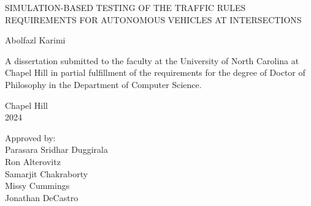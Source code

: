 \begin{titlepage}
\begin{center}


\vspace{2in}
\begin{singlespace}
    \MakeUppercase{Simulation-based Testing of the Traffic Rules Requirements for Autonomous Vehicles at Intersections}\\ %
\end{singlespace}


\vspace{61pt} %
Abolfazl Karimi
\end{center}



\vspace{39pt}
\begin{singlespace}
\noindent
\begin{center}
A dissertation submitted to the faculty at the University of North Carolina at Chapel Hill
in partial fulfillment of the requirements for the degree of Doctor of Philosophy in
the Department of Computer Science.
\end{center}
\end{singlespace}


\vspace{39pt}
\begin{center}
\begin{singlespace}
Chapel Hill\\
2024
\end{singlespace}
\end{center}


\vspace{39pt}
\begin{flushright}
\begin{minipage}[t]{1.8333 in}
Approved by:\\
Parasara Sridhar Duggirala\\
Ron Alterovitz\\
Samarjit Chakraborty\\
Missy Cummings\\
Jonathan DeCastro\\
\end{minipage}
\end{flushright}

\end{titlepage}
